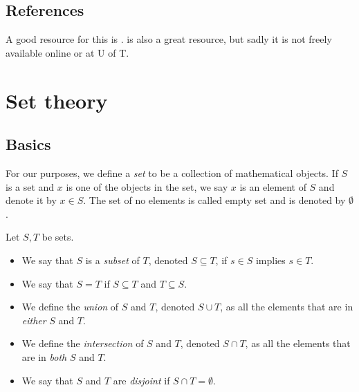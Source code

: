 \documentclass{article}
\begin{document}


%


\subsection{References}
A good resource for this is \textcite{proofs}. \textcite{toolsreasoning} is also a great resource, but sadly it is not freely available online or at U of T.


\section{Set theory}

\subsection{Basics}

For our purposes, we define a \emph{set} to be a collection of mathematical objects. If $S$ is a set and $x$ is one of the objects in the set, we say $x$ is an element of $S$ and denote it by $x\in S$. The set of no elements is called empty set and is denoted by $\emptyset$.

\begin{definition}
Let $S, T$ be sets. 
\begin{itemize}
    \item We say that $S$ is a \emph{subset} of $T$, denoted $S\subseteq T$, if $s\in S$ implies $s\in T$. 
    \item We say that $S=T$ if $S\subseteq T$ and $T\subseteq S$.
    \item We define the \emph{union} of $S$ and $T$, denoted $S \cup T$, as all the elements that are in \emph{either} $S$ and $T$.
    \item We define the \emph{intersection} of $S$ and $T$, denoted $S \cap T$, as all the elements that are in \emph{both} $S$ and $T$.
    \item We say that $S$ and $T$ are \emph{disjoint} if $S \cap T = \emptyset$.
\end{itemize}
\end{definition}
\end{document}
